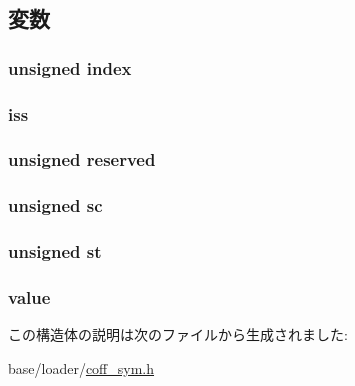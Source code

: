 \subsection{変数}
\hypertarget{structecoff__sym_a360ebf6209d16512186ca7adb893abbb}{
\subsubsection[{index}]{\setlength{\rightskip}{0pt plus 5cm}unsigned {\bf index}}}
\label{structecoff__sym_a360ebf6209d16512186ca7adb893abbb}
\hypertarget{structecoff__sym_afbddcadc409c0ae593b2d7e4d5a368de}{
\subsubsection[{iss}]{ {\bf iss}}}
\label{structecoff__sym_afbddcadc409c0ae593b2d7e4d5a368de}
\hypertarget{structecoff__sym_a6a6017ea077b575677a11d733ec137a3}{
\subsubsection[{reserved}]{\setlength{\rightskip}{0pt plus 5cm}unsigned {\bf reserved}}}
\label{structecoff__sym_a6a6017ea077b575677a11d733ec137a3}
\hypertarget{structecoff__sym_afeb925285a478f289b24ee0d0c59e96f}{
\subsubsection[{sc}]{\setlength{\rightskip}{0pt plus 5cm}unsigned {\bf sc}}}
\label{structecoff__sym_afeb925285a478f289b24ee0d0c59e96f}
\hypertarget{structecoff__sym_ad31a126434d7ce705a87f60e04d987b2}{
\subsubsection[{st}]{\setlength{\rightskip}{0pt plus 5cm}unsigned {\bf st}}}
\label{structecoff__sym_ad31a126434d7ce705a87f60e04d987b2}
\hypertarget{structecoff__sym_a5a9763340498bedad4bd83abdaaa3f0a}{
\subsubsection[{value}]{ {\bf value}}}
\label{structecoff__sym_a5a9763340498bedad4bd83abdaaa3f0a}


この構造体の説明は次のファイルから生成されました:\begin{DoxyCompactItemize}
\item 
base/loader/\hyperlink{coff__sym_8h}{coff\_\-sym.h}\end{DoxyCompactItemize}
